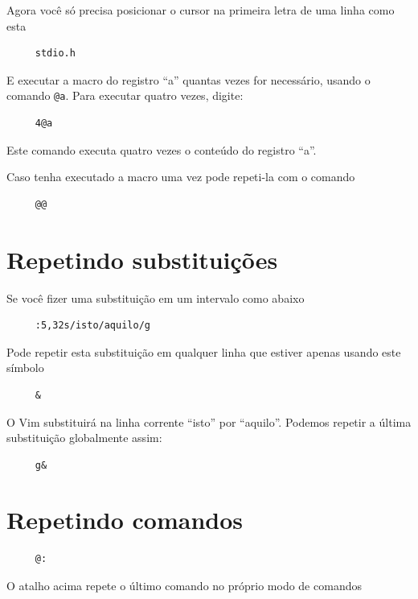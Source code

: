 \documentclass[10pt,a4paper,openany]{book}
\begin{document}
Agora você só precisa posicionar o cursor na primeira letra de uma linha como esta

\begin{verbatim}
     stdio.h
\end{verbatim}

E executar a macro do registro ``a'' quantas vezes for necessário,
usando o comando \verb|@a|. Para executar quatro vezes, digite:

\begin{verbatim}
     4@a
\end{verbatim}

Este comando executa quatro vezes o conteúdo do registro ``a''.

Caso tenha executado a macro uma vez pode repeti-la com o comando

\begin{verbatim}
     @@
\end{verbatim}

\section{Repetindo substituições }
Se você fizer uma substituição em um intervalo como abaixo

\begin{verbatim}
     :5,32s/isto/aquilo/g
\end{verbatim}

Pode repetir esta substituição em qualquer linha que estiver apenas usando este símbolo

\begin{verbatim}
     &
\end{verbatim}

O Vim substituirá na linha corrente ``isto'' por ``aquilo''. Podemos
repetir a última substituição globalmente assim:
   
\begin{verbatim}
     g&
\end{verbatim}

\section{Repetindo comandos}\label{Repetindo comandos}

\begin{verbatim}
     @:
\end{verbatim}

O atalho acima repete o último comando no próprio modo de comandos
\end{document}
